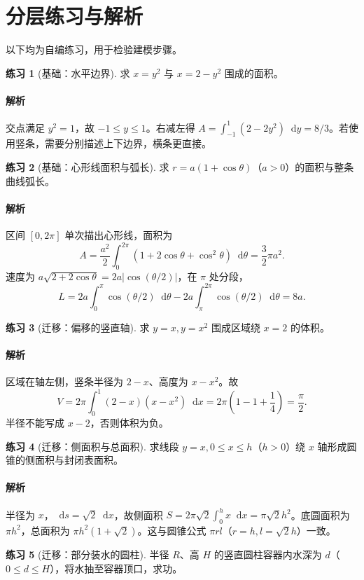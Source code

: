 \documentclass[UTF8,fontset=fandol,12pt,oneside,openany]{ctexrep}
\newcommand{\dd}{\mathop{}\!\mathrm d}
\theoremstyle{definition}
\newtheorem{exercise}{练习}[chapter]
\begin{document}
\section{分层练习与解析}
以下均为自编练习，用于检验建模步骤。
\begin{exercise}[基础：水平边界]
求 $x=y^2$ 与 $x=2-y^2$ 围成的面积。
\end{exercise}
\paragraph{解析}交点满足 $y^2=1$，故 $-1\le y\le1$。右减左得
$A=\int_{-1}^1(2-2y^2)\dd y=8/3$。若使用竖条，需要分别描述上下边界，横条更直接。

\begin{exercise}[基础：心形线面积与弧长]
求 $r=a(1+\cos\theta)$（$a>0$）的面积与整条曲线弧长。
\end{exercise}
\paragraph{解析}区间 $[0,2\pi]$ 单次描出心形线，面积为
\[
 A=\frac{a^2}{2}\int_0^{2\pi}(1+2\cos\theta+\cos^2\theta)\dd\theta
 =\frac32\pi a^2.
\]
速度为 $a\sqrt{2+2\cos\theta}=2a|\cos(\theta/2)|$，在 $\pi$ 处分段，
\[
 L=2a\int_0^\pi\cos(\theta/2)\dd\theta
 -2a\int_\pi^{2\pi}\cos(\theta/2)\dd\theta=8a.
\]

\begin{exercise}[迁移：偏移的竖直轴]
求 $y=x,y=x^2$ 围成区域绕 $x=2$ 的体积。
\end{exercise}
\paragraph{解析}区域在轴左侧，竖条半径为 $2-x$、高度为 $x-x^2$。故
\[
 V=2\pi\int_0^1(2-x)(x-x^2)\dd x
 =2\pi\left(1-1+\frac14\right)=\frac\pi2.
\]
半径不能写成 $x-2$，否则体积为负。

\begin{exercise}[迁移：侧面积与总面积]
求线段 $y=x,0\le x\le h$（$h>0$）绕 $x$ 轴形成圆锥的侧面积与封闭表面积。
\end{exercise}
\paragraph{解析}半径为 $x$，$\dd s=\sqrt2\dd x$，故侧面积
$S=2\pi\sqrt2\int_0^hx\dd x=\pi\sqrt2h^2$。底圆面积为 $\pi h^2$，总面积为 $\pi h^2(1+\sqrt2)$。这与圆锥公式 $\pi r l$（$r=h,l=\sqrt2h$）一致。

\begin{exercise}[迁移：部分装水的圆柱]
半径 $R$、高 $H$ 的竖直圆柱容器内水深为 $d$（$0\le d\le H$），将水抽至容器顶口，求功。
\end{exercise}
\end{document}
